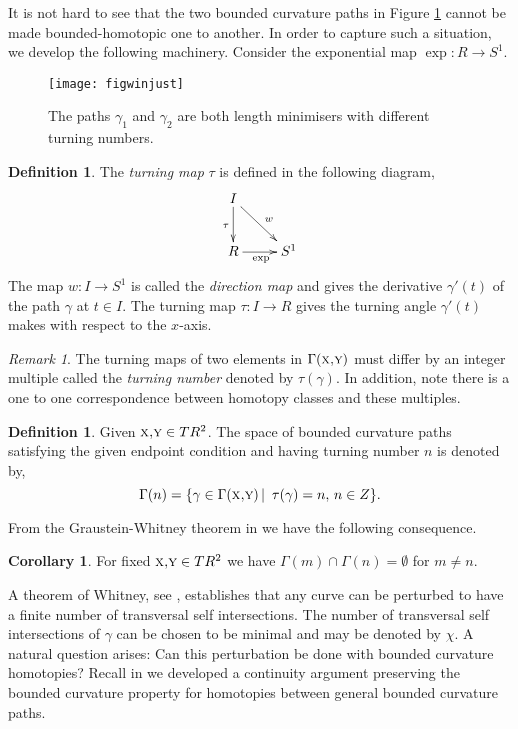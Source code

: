 \documentclass{amsart}
\theoremstyle{definition}
\newtheorem{definition}[theorem]{Definition}
\newtheorem{corollary}[theorem]{Corollary}
\theoremstyle{remark}
\newtheorem{remark}[theorem]{Remark}
\numberwithin{equation}{section}
\begin{document}
It is not hard to see that the two bounded curvature paths in Figure \ref{figwinjust} cannot be made bounded-homotopic one to another. In order to capture such a situation, we develop the following machinery. Consider the exponential map $\exp: {R} \rightarrow {S}^1$.

{ \begin{figure} [[htbp]
 \begin{center}
\texttt{[image: figwinjust]}
\end{center}
\caption{The paths $\gamma_1$ and $\gamma_2$ are both length minimisers with different turning numbers.}
\label{figwinjust}
\end{figure}}

\begin{definition} The {\it turning map} $\tau$ is defined in the following diagram,
\[ \xymatrix{ I  \ar[d]_{\tau}   \ar@{>}[dr]^{w} &  \\
                     { R} \ar[r]_{\exp}  & { S}^1} \]
The map $w:I \rightarrow { S}^1$ is called the {\it direction map} and gives the derivative $\gamma'(t)$ of the path $\gamma$ at $t\in I$. The turning map $\tau:I\rightarrow {R}$ gives the turning angle $\gamma'(t)$ makes with respect to the $x$-axis.
\end{definition}

\begin{remark} The turning maps of two elements in $\Gamma(\mbox{\sc x,y})$ must differ by an integer multiple called the {\it turning number} denoted by $\tau(\gamma)$. In addition, note there is a one to one correspondence between homotopy classes and these multiples.
\end{remark}
  \begin{definition} Given $\mbox{\sc x,y}\in T{ R}^2$. The space of bounded curvature paths satisfying the given endpoint condition and having turning number $n$ is denoted by,
$${\Gamma}(n)=\{\gamma \in {\Gamma}(\mbox{\sc x,y}) \,|\,\,\, \tau(\gamma)=n,\,n\in {Z}\}.$$
\end{definition}

From the Graustein-Whitney theorem in \cite{whitney} we have the following consequence.

\begin{corollary} \label{wcpm} For fixed $\mbox{\sc x,y}\in T{R}^2$ we have ${\Gamma}(m)\cap {\Gamma}(n)=\emptyset$ for $m\neq n$.
\end{corollary}

A theorem of Whitney, see \cite{whitney}, establishes that any curve can be perturbed to have a finite number of transversal self intersections. The number of transversal self intersections of $\gamma$ can be chosen to be minimal and may be denoted by $\chi$. 
 A natural question arises: Can this perturbation be done with bounded curvature homotopies? Recall in \cite{paperd} we developed a continuity argument preserving the bounded curvature property for homotopies between general bounded curvature paths. 
 
\end{document}
